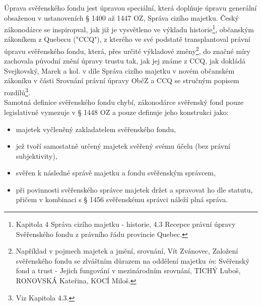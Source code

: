 \documentclass{article}
\begin{document}

Úprava svěřenského fondu jest úpravou speciální, která doplňuje úpravu generální obsaženou v ustanoveních § 1400 až 1447 OZ, Správa cizího majetku. Český zákonodárce se inspiropval, jak již je vysvětleno ve výkladu historie\footnote{Kapitola 4 Správa cizího majetku - historie, 4.3 Recepce právní úpravy Svěřenského fondu z právního řádu provincie Quebec.}, občanským zákoníkem z Quebecu ("CCQ"), z kterého ve své podstatě transplantoval právní úpravu svěřenského fondu, která, přes určité výkladové změny\footnote{Například v pojmech majetek a jmění, srovnání, Vít Zvánovec, Založení svěřenského fondu se zlváštním důrazem na oddělení majetku \textit{in}: Svěřenský fond a trust - Jejich fungování v mezinárodním srovnání, TICHÝ Luboš, RONOVSKÁ Kateřina, KOCÍ Miloš.}, do značné míry zachovala původní znění úpravy trustu tak, jak jej známe z CCQ, jak dokládá Svejkovský, Marek a kol. v díle Správa cizího majetku v novém občanském zákoníku v části Srovnání právní úpravy ObčZ a CCQ se stručným popisem rozdílů\footnote{Viz Kapitola 4.3.}.\\ 

Samotná definice svěřenského fondu chybí, zákonodárce svěřenský fond pouze legislativně vymezuje v § 1448 OZ a pouze definuje jeho konstrukci jako:\\

\begin{itemize}
\item majetek vyčleněný zakladatelem svěřenského fondu,
\item jež tvoří samostatně určený majetek svěřený svému účelu (bez právní subjektivity),
\item svěřen k následné správě majetku a fondu svěřenským správcem,
\item při povinnosti svěřenského správce majetek držet a spravovat ho dle statutu, přičem v kombinaci s § 1456 svěřenskému správci náleží plná správa.	
\end{itemize}
\end{document}
